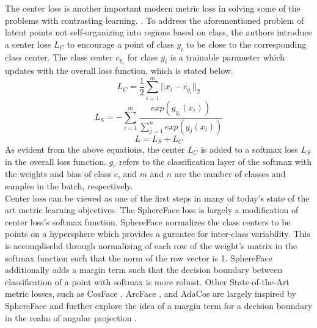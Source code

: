 \documentclass[./dissertation.tex]{subfiles}
\begin{document}
    The center loss is another important modern metric loss in solving some of the problems with contrasting learning. \cite{10.1007/978-3-319-46478-7_31}. To address the aforementioned problem of latent points not self-organizing into regions based on class, the authors introduce a center loss $L_{C}$ to encourage a point of class $y_{i}$ to be close to the corresponding class center. The class center $c_{y_{i}}$ for class $y_{i}$ is a trainable parameter which updates with the overall loss function, which is stated below.
    \begin{equation*}
    L_{C} = \frac{1}{2}\sum_{i = 1}^{m}||x_{i} - c_{y_{i}}||_{2} \end{equation*}
    \begin{equation*}
    L_{S} = - \sum_{i = 1}^{m}\frac{exp(g_{y_{i}}(x_{i}))}{\sum_{j = 1}^{n}exp(g_{j}(x_{i}))} 
    \end{equation*}
    \begin{equation*}
    L = L_{S} + L_{C}
    \end{equation*}
    As evident from the above equations, the center $L_{C}$ is added to a softmax loss $L_{S}$ in the overall loss function. $g_{c}$ refers to the classification layer of the softmax with the weights and bias of class $c$, and $m$ and $n$ are the number of classes and samples in the batch, respectively. \\
    
    Center loss can be viewed as one of the first steps in many of today's state of the art metric learning objectives. The SphereFace loss \cite{liu2017sphereface} is largely a modification of center loss's softmax function. SphereFace normalizes the class centers to be points on a hypersphere which provides a gurantee for inter-class variability. This is accomplisehd through normalizing of each row of the weight's matrix in the softmax function such that the norm of the row vector is 1. SphereFace additionally adds a margin term such that the decision boundary between classification of a point with softmax is more robust.  Other State-of-the-Art metric losses, such as CosFace \cite{wang2018cosface}, ArcFace \cite{deng2019arcface}, and AdaCos \cite{zhang2019adacos} are largely inspired by SphereFace and further explore the idea of a margin term for a decision boundary in the realm of angular projection \cite{hav4ik2021deepmetriclearning}. 
\end{document}

